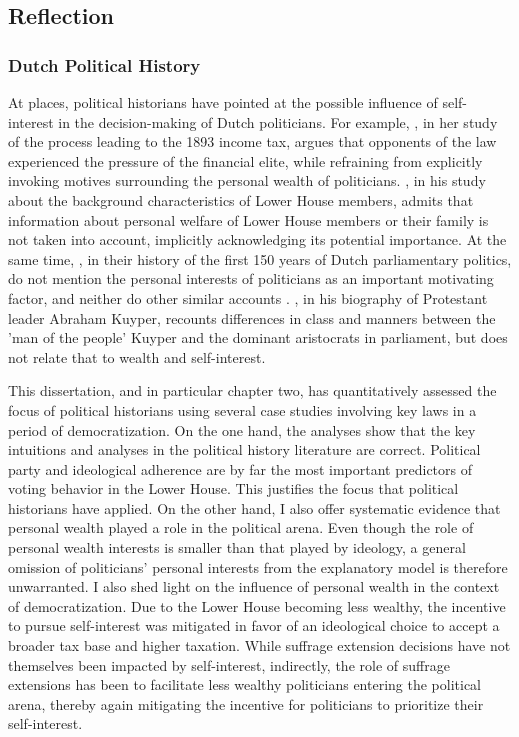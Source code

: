 \subsection{Reflection}\label{sec:reflection}

\subsubsection{Dutch Political History}

At places, political historians have pointed at the possible influence of self-interest in the decision-making of Dutch politicians. For example, \cite{smit2002omwille}, in her study of the process leading to the 1893 income tax, argues that opponents of the law experienced the pressure of the financial elite, while refraining from explicitly invoking motives surrounding the personal wealth of politicians. \cite{van1983toegang}, in his study about the background characteristics of Lower House members, admits that information about personal welfare of Lower House members or their family is not taken into account, implicitly acknowledging its potential importance. At the same time, \cite{van2013eerste}, in their history of the first 150 years of Dutch parliamentary politics, do not mention the personal interests of politicians as an important motivating factor, and neither do other similar accounts \cite{de2003het, de2014ons}. \cite{koch2020abraham}, in his biography of Protestant leader Abraham Kuyper, recounts differences in class and manners between the 'man of the people' Kuyper and the dominant aristocrats in parliament, but does not relate that to wealth and self-interest. 

This dissertation, and in particular chapter two, has quantitatively assessed the focus of political historians using several case studies involving key laws in a period of democratization. On the one hand, the analyses show that the key intuitions and analyses in the political history literature are correct. Political party and ideological adherence are by far the most important predictors of voting behavior in the Lower House. This justifies the focus that political historians have applied. On the other hand, I also offer systematic evidence that personal wealth played a role in the political arena. Even though the role of personal wealth interests is smaller than that played by ideology, a general omission of politicians' personal interests from the explanatory model is therefore unwarranted. I also shed light on the influence of personal wealth in the context of democratization. Due to the Lower House becoming less wealthy, the incentive to pursue self-interest was mitigated in favor of an ideological choice to accept a broader tax base and higher taxation. While suffrage extension decisions have not themselves been impacted by self-interest, indirectly, the role of suffrage extensions has been to facilitate less wealthy politicians entering the political arena, thereby again mitigating the incentive for politicians to prioritize their self-interest. 

